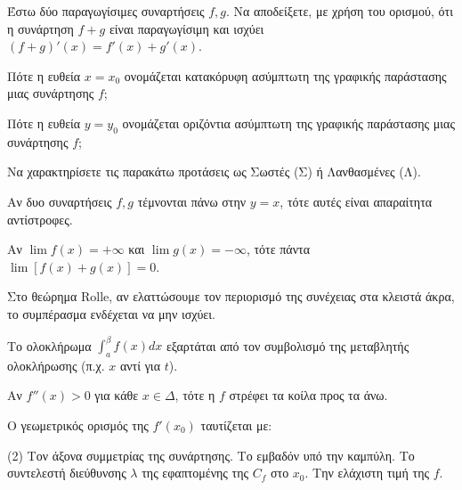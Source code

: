 \documentclass[11pt,a4paper]{article}
\newcommand{\kerkissans}[1]{{\fontfamily{maksf}\selectfont \textbf{#1}}}
\renewcommand{\textdexiakeraia}{}
\newcommand\themanum{A}
\newcounter{thema}[section]
\renewcommand{\thethema}{\arabic{thema}}
\newcommand{\Thema}{\refstepcounter{thema}{\textbf{\textcolor{black}{\faPenSquare\ \  \large \kerkissans{\textbf{\thethemaο\hspace{2mm}Θέμα}}}}}\hspace{0mm}}{}
\newenvironment{thema}[1]
{\begin{tcolorbox}[title=\Thema\kerkissans{\textbf{\large{  #1}}},breakable,
enhanced standard,titlerule=0pt,toprule=0pt, rightrule=0pt, bottomrule=0pt,
colback=white,left=0mm,top=1mm,bottom=0mm,
boxrule=0pt,
colframe=white,leftrule=0mm,sharp corners,coltitle=black]
\renewcommand{\themanum}{#1}}
{\end{tcolorbox}}
\begin{document}
\begin{thema}{A}
\begin{erwthma}
    \item Έστω δύο παραγωγίσιμες συναρτήσεις $f, g$. Να αποδείξετε, με χρήση του ορισμού, ότι η συνάρτηση $f+g$ είναι παραγωγίσιμη και ισχύει $(f+g)'(x) = f'(x) + g'(x)$.
    \item Πότε η ευθεία $x=x_0$ ονομάζεται κατακόρυφη ασύμπτωτη της γραφικής παράστασης μιας συνάρτησης $f$;
    \item Πότε η ευθεία $y=y_0$ ονομάζεται οριζόντια ασύμπτωτη της γραφικής παράστασης μιας συνάρτησης $f$;
    \item Να χαρακτηρίσετε τις παρακάτω προτάσεις ως Σωστές (Σ) ή Λανθασμένες (Λ).
    \begin{alist}
        \item Αν δυο συναρτήσεις $f, g$ τέμνονται πάνω στην $y=x$, τότε αυτές είναι απαραίτητα αντίστροφες.
        \item Αν $\lim f(x)=+\infty$ και $\lim g(x)=-\infty$, τότε πάντα $\lim[f(x)+g(x)]=0$.
        \item Στο θεώρημα Rolle, αν ελαττώσουμε τον περιορισμό της συνέχειας στα κλειστά άκρα, το συμπέρασμα ενδέχεται να μην ισχύει.
        \item Το ολοκλήρωμα $\int_a^\beta f(x) dx$ εξαρτάται από τον συμβολισμό της μεταβλητής ολοκλήρωσης (π.χ. $x$ αντί για $t$).
        \item Αν $f''(x) > 0$ για κάθε $x \in \Delta$, τότε η $f$ στρέφει τα κοίλα προς τα άνω.
    \end{alist}
    \item Ο γεωμετρικός ορισμός της $f'(x_0)$ ταυτίζεται με:
    \begin{tasks}[label=\let\textdexiakeraia\relax\alph*.](2)
        \task Τον άξονα συμμετρίας της συνάρτησης.
        \task Το εμβαδόν υπό την καμπύλη.
        \task Το συντελεστή διεύθυνσης $\lambda$ της εφαπτομένης της $C_f$ στο $x_0$.
        \task Την ελάχιστη τιμή της $f$.
    \end{tasks}
\end{erwthma}
\end{thema}
\vspace{1cm}
\end{document}
